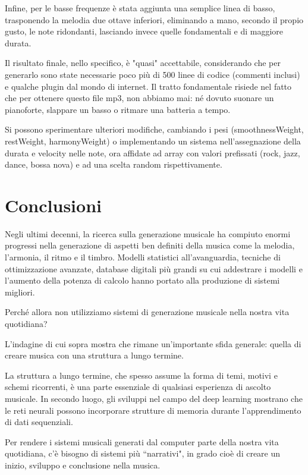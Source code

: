 \documentclass[a4paper,12pt]{report}
\begin{document}
Infine, per le basse frequenze è stata aggiunta una semplice linea di basso, trasponendo la melodia due ottave inferiori, eliminando a mano, secondo il propio gusto, le note ridondanti, lasciando invece quelle fondamentali e di maggiore durata.

Il risultato finale, nello specifico, è "quasi" accettabile, considerando che per generarlo sono state necessarie poco più di 500 linee di codice (commenti inclusi) e qualche plugin dal mondo di internet.
Il tratto fondamentale risiede nel fatto che per ottenere questo file mp3, non abbiamo mai: né dovuto suonare un pianoforte, slappare un basso o ritmare una batteria a tempo.

Si possono sperimentare ulteriori modifiche, cambiando i pesi (smoothnessWeight, restWeight, harmonyWeight) o implementando un sistema nell'assegnazione della durata e velocity nelle note, ora affidate ad array con valori prefissati (rock, jazz, dance, bossa nova) e ad una scelta random rispettivamente.

\chapter{Conclusioni}

Negli ultimi decenni, la ricerca sulla generazione musicale ha compiuto enormi progressi nella generazione di aspetti ben definiti della musica come la melodia, l’armonia, il ritmo e il timbro. 
Modelli statistici all’avanguardia, tecniche di ottimizzazione avanzate, database digitali più grandi su cui addestrare i modelli e l’aumento della potenza di calcolo hanno portato alla produzione di sistemi migliori. 

Perché allora non utilizziamo sistemi di generazione musicale nella nostra vita quotidiana? 

L’indagine di cui sopra mostra che rimane un’importante sfida generale: quella di creare musica con una struttura a lungo termine.

La struttura a lungo termine, che spesso assume la forma di temi, motivi e schemi ricorrenti, è una parte essenziale di qualsiasi esperienza di ascolto musicale. In secondo luogo, gli sviluppi nel campo del deep learning mostrano che le reti neurali possono incorporare strutture di memoria durante l'apprendimento di dati sequenziali. 

Per rendere i sistemi musicali generati dal computer parte della nostra vita quotidiana, c’è bisogno di sistemi più “narrativi", in grado cioè di creare un inizio, sviluppo e conclusione nella musica. 
\end{document}
